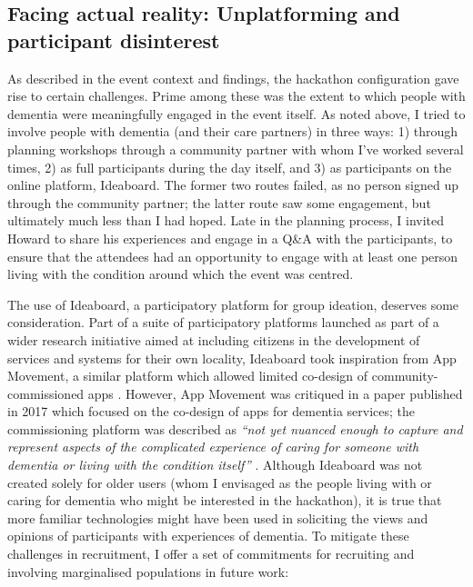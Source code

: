 \subsection{Facing actual reality: Unplatforming and participant disinterest}
\label{DiscussionTwo}
As described in the event context and findings, the hackathon configuration gave rise to certain challenges. Prime among these was the extent to which people with dementia were meaningfully engaged in the event itself. As noted above, I tried to involve people with dementia (and their care partners) in three ways: 1) through planning workshops through a community partner with whom I've worked several times, 2) as full participants during the day itself, and 3) as participants on the online platform, Ideaboard. The former two routes failed, as no person signed up through the community partner; the latter route saw some engagement, but ultimately much less than I had hoped. Late in the planning process, I invited Howard to share his experiences and engage in a Q\&A with the participants, to ensure that the attendees had an opportunity to engage with at least one person living with the condition around which the event was centred. 

The use of Ideaboard, a participatory platform for group ideation, deserves some consideration. Part of a suite of participatory platforms launched as part of a wider research initiative aimed at including citizens in the development of services and systems for their own locality, Ideaboard took inspiration from App Movement, a similar platform which allowed limited co-design of community-commissioned apps \citep{garbett_app_2016}. However, App Movement was critiqued in a paper published in 2017 which focused on the co-design of apps for dementia services; the commissioning platform was described as \textit{``not yet nuanced enough to capture and represent aspects of the complicated experience of caring for someone with dementia or living with the condition itself''} \citep{morrissey_care_2017}. Although Ideaboard was not created solely for older users (whom I envisaged as the people living with or caring for dementia who might be interested in the hackathon), it is true that more familiar technologies might have been used in soliciting the views and opinions of participants with experiences of dementia. To mitigate these challenges in recruitment, I offer a set of commitments for recruiting and involving marginalised populations in future work:

